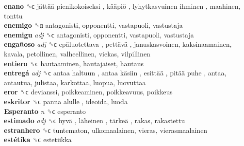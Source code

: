 \textbf{enano} ␝ϲ   jättää pienikokoiseksi ,  kääpiö ,  lyhytkasvuinen ihminen , maahinen, tonttu  \\
\textbf{enemigo} ␝α  antagonisti, opponentti, vastapuoli, vastustaja  \\
\textbf{enemigu} \emph{adj}  ␝ϲ  antagonisti, opponentti, vastapuoli, vastustaja  \\
\textbf{engañoso} \emph{adj}  ␝ϲ   epäluotettava ,  pettävä , januskasvoinen, kaksinaamainen, kavala, petollinen, valheellinen, viekas, vilpillinen  \\
\textbf{entiero} ␝ϲ  hautaaminen, hautajaiset, hautaus  \\
\textbf{entregá} \emph{adj}  ␝ϲ   antaa haltuun ,  antaa käsiin ,  esittää ,  pitää puhe , antaa, antautua, julistaa, karkottaa, luopua, luovuttaa  \\
\textbf{eror} ␝ϲ  devianssi, poikkeaminen, poikkeavuus, poikkeus  \\
\textbf{eskritor} ␝ϲ   panna alulle , ideoida, luoda  \\
\textbf{Esperanto} \emph{n}  ␝ϲ  esperanto  \\
\textbf{estimado} \emph{adj}  ␝ϲ   hyvä ,  läheinen ,  tärkeä , rakas, rakastettu  \\
\textbf{estranhero} ␝ϲ  tuntematon, ulkomaalainen, vieras, vierasmaalainen  \\
\textbf{estétika} ␝ϲ  estetiikka  \\
